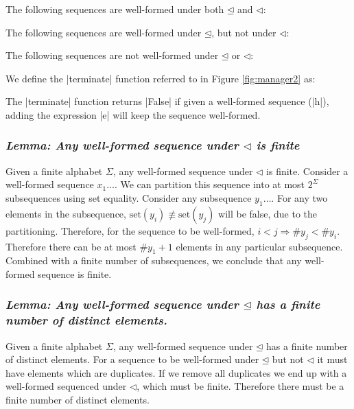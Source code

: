 \documentclass[draft]{sigplanconf}
\newcommand{\lemma}[1]{\subsubsection*{\textit{Lemma: #1}}}
\newcommand{\set}{\mathrm{set}}
\begin{document}
The following sequences are well-formed under both $\unlhd$ and $\lhd$:

\begin{code}
\end{code}

The following sequences are well-formed under $\unlhd$, but not under $\lhd$:

\begin{code}
\end{code}

The following sequences are not well-formed under $\unlhd$ or $\lhd$:

\begin{code}
\end{code}

We define the |terminate| function referred to in Figure \ref{fig:manager2} as:


The |terminate| function returns |False| if given a well-formed sequence (|h|), adding the expression |e| will keep the sequence well-formed.

\lemma{Any well-formed sequence under $\lhd$ is finite}

Given a finite alphabet $\Sigma$, any well-formed sequence under $\lhd$ is finite. Consider a well-formed sequence $x_1\ldots$. We can partition this sequence into at most $2^\Sigma$ subsequences using set equality. Consider any subsequence $y_1\ldots$. For any two elements in the subsequence, $\set(y_i) \not\equiv \set(y_j)$ will be false, due to the partitioning. Therefore, for the sequence to be well-formed, $i < j \Rightarrow \# y_j < \# y_i$. Therefore there can be at most $\#y_1+1$ elements in any particular subsequence. Combined with a finite number of subsequences, we conclude that any well-formed sequence is finite.

\lemma{Any well-formed sequence under $\unlhd$ has a finite number of distinct elements.}

Given a finite alphabet $\Sigma$, any well-formed sequence under $\unlhd$ has a finite number of distinct elements. For a sequence to be well-formed under $\unlhd$ but not $\lhd$ it must have elements which are duplicates. If we remove all duplicates we end up with a well-formed sequenced under $\lhd$, which must be finite. Therefore there must be a finite number of distinct elements.
\end{document}
